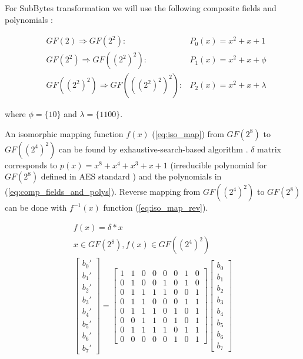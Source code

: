 For SubBytes transformation we will use the following composite fields and polynomials \cite{vlsi}:

\begin{equation}
\begin{aligned}
\label{eq:comp_fields_and_polys}
&GF(2) \Rightarrow GF(2^2) :               & P_0(x) = x^2 + x + 1\\
&GF(2^2) \Rightarrow GF((2^2)^2) :         & P_1(x) = x^2 + x + \phi\\
&GF((2^2)^2) \Rightarrow GF(((2^2)^2)^2) : & P_2(x) = x^2 + x + \lambda
\end{aligned}
\end{equation}

where $\phi = \{10\}$ and $\lambda = \{1100\}$.

An isomorphic mapping function $f(x)$ (\ref{eq:iso_map}) from $GF(2^8)$ to $GF((2^4)^2)$ can be found by exhaustive-search-based algorithm \cite{vlsi}. $\delta$ matrix corresponds to $p(x) = x^8 + x^4 + x^3 + x + 1$ (irreducible polynomial for $GF(2^8)$ defined in AES standard \cite{aes-standard}) and the polynomials in (\ref{eq:comp_fields_and_polys}). Reverse mapping from $GF((2^4)^2)$ to $GF(2^8)$ can be done with $f^{-1}(x)$ function (\ref{eq:iso_map_rev}).

\begin{equation}
\begin{gathered}
\label{eq:iso_map}
f(x) = \delta * x\\
x \in GF(2^8), f(x) \in GF((2^4)^2) \\
\begin{bmatrix}
b_0'\\b_1'\\b_2'\\b_3'\\b_4'\\b_5'\\b_6'\\b_7'
\end{bmatrix}
=
\begin{bmatrix}
    1 & 1 & 0 & 0 & 0 & 0 & 1 & 0 \\
    0 & 1 & 0 & 0 & 1 & 0 & 1 & 0 \\
    0 & 1 & 1 & 1 & 1 & 0 & 0 & 1 \\
    0 & 1 & 1 & 0 & 0 & 0 & 1 & 1 \\
    0 & 1 & 1 & 1 & 0 & 1 & 0 & 1 \\
    0 & 0 & 1 & 1 & 0 & 1 & 0 & 1 \\
    0 & 1 & 1 & 1 & 1 & 0 & 1 & 1 \\
    0 & 0 & 0 & 0 & 0 & 1 & 0 & 1
\end{bmatrix}
\begin{bmatrix}
b_0\\b_1\\b_2\\b_3\\b_4\\b_5\\b_6\\b_7
\end{bmatrix}
\end{gathered}
\end{equation}

